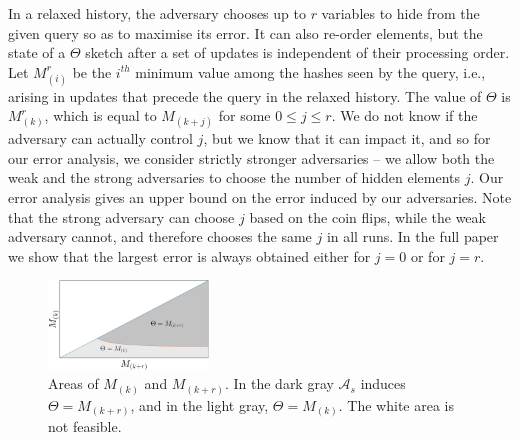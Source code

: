 In a relaxed history, the adversary chooses up to $r$ variables to hide from the given query so as to maximise its
error. It can also re-order elements, but the state of a $\Theta$ sketch after a set of updates
is independent of their processing order. Let $M^r_{(i)}$ be the $i^{th}$ minimum value among
the hashes seen by the query, i.e., arising in updates that precede the query in the relaxed history.
The value of $\Theta$ is $M^r_{(k)}$, which is equal to $M_{(k+j)}$ for some $0 \leq j \leq r$.
We do not know if the adversary can actually control $j$,
but we know that it can impact it, %
and so for our error analysis, we consider strictly stronger adversaries --
we allow both the weak and the strong adversaries to choose the number of hidden
elements $j$. Our error analysis gives an upper bound on the error induced by our adversaries.
Note that the strong adversary can choose $j$ based on the coin flips,
while the weak adversary cannot, and therefore chooses the same $j$ in all runs.
In the full paper~\cite{rinberg2019fast} we show that
the largest error is always obtained either for $j=0$ or for $j=r$. 
\begin{figure}[b]
    \begin{center}
        \includegraphics[width=0.38\textwidth]{images/areaGraph.png}
    \end{center}
    \caption{Areas of $M_{(k)}$ and $M_{(k+r)}$. In the dark gray 
    ${\mathcal{A}}_s$ induces $\Theta=M_{(k+r)}$, and in the light gray, $\Theta=M_{(k)}$. The white
    area is not feasible.} %
    \label{fig:areaGraph}
\end{figure}

